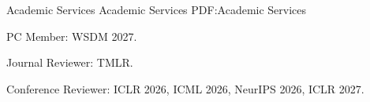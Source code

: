 \Section
{Academic Services}
{Academic Services}
{PDF:Academic Services}

\BulletItem
PC Member: WSDM 2027.

\BulletItem
Journal Reviewer: TMLR.

\BulletItem
Conference Reviewer: ICLR 2026, ICML 2026, NeurIPS 2026, ICLR 2027.
